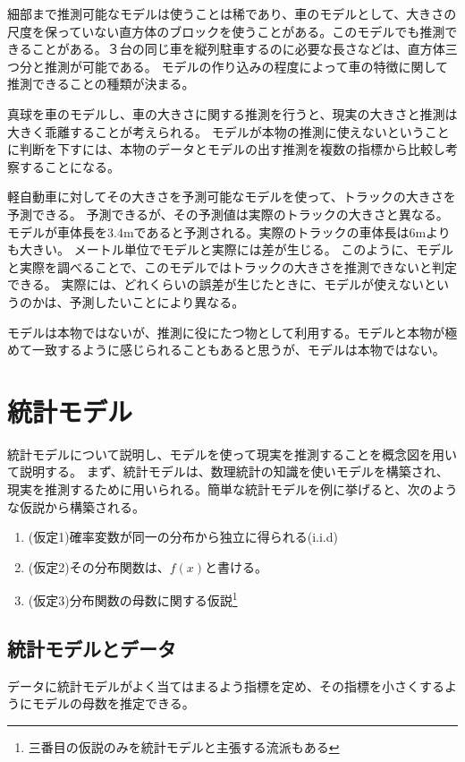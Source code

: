 細部まで推測可能なモデルは使うことは稀であり、車のモデルとして、大きさの尺度を保っていない直方体のブロックを使うことがある。このモデルでも推測できることがある。３台の同じ車を縦列駐車するのに必要な長さなどは、直方体三つ分と推測が可能である。
モデルの作り込みの程度によって車の特徴に関して推測できることの種類が決まる。

真球を車のモデルし、車の大きさに関する推測を行うと、現実の大きさと推測は大きく乖離することが考えられる。
モデルが本物の推測に使えないということに判断を下すには、本物のデータとモデルの出す推測を複数の指標から比較し考察することになる。


軽自動車に対してその大きさを予測可能なモデルを使って、トラックの大きさを予測できる。
予測できるが、その予測値は実際のトラックの大きさと異なる。
モデルが車体長を3.4mであると予測される。実際のトラックの車体長は6mよりも大きい。
メートル単位でモデルと実際には差が生じる。
このように、モデルと実際を調べることで、このモデルではトラックの大きさを推測できないと判定できる。
実際には、どれくらいの誤差が生じたときに、モデルが使えないというのかは、予測したいことにより異なる。


モデルは本物ではないが、推測に役にたつ物として利用する。モデルと本物が極めて一致するように感じられることもあると思うが、モデルは本物ではない。



\section{統計モデル}
統計モデルについて説明し、モデルを使って現実を推測することを概念図を用いて説明する。
まず、統計モデルは、数理統計の知識を使いモデルを構築され、現実を推測するために用いられる。簡単な統計モデルを例に挙げると、次のような仮説から構築される。

\begin{enumerate}
    \item (仮定1)確率変数が同一の分布から独立に得られる(i.i.d)
    \item (仮定2)その分布関数は、$f(x)$と書ける。
    \item (仮定3)分布関数の母数に関する仮説\footnote{三番目の仮説のみを統計モデルと主張する流派もある\cite{塩見_正衛2021}}
\end{enumerate}

\subsection{統計モデルとデータ}
データに統計モデルがよく当てはまるよう指標を定め、その指標を小さくするようにモデルの母数を推定できる。




